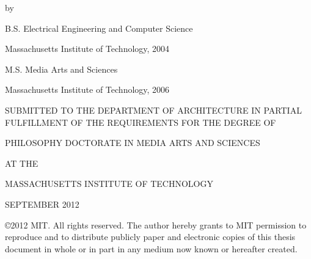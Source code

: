 \thispagestyle{empty}
\begin{addmargin}[-1cm]{-3cm}
\begin{center}
    \begingroup
        \color{Maroon}\spacedallcaps{\myTitle}
    \endgroup

    by

    \spacedlowsmallcaps{\myName}

    \vspace{2mm}
    
    B.S. Electrical Engineering and Computer Science
    
    Massachusetts Institute of Technology, 2004
    
    \vspace{2mm}

    M.S. Media Arts and Sciences
    
    Massachusetts Institute of Technology, 2006
    
    \vspace{2mm}

SUBMITTED TO THE DEPARTMENT OF ARCHITECTURE IN PARTIAL
FULFILLMENT OF THE REQUIREMENTS FOR THE DEGREE OF

    \vspace{2mm}

PHILOSOPHY DOCTORATE IN MEDIA ARTS AND SCIENCES

AT THE

MASSACHUSETTS INSTITUTE OF TECHNOLOGY

    \vspace{2mm}

SEPTEMBER 2012

    \vspace{2mm}

\copyright 2012 MIT.  All rights reserved.
The author hereby grants to MIT permission to reproduce
and to distribute publicly paper and electronic
copies of this thesis document in whole or in part
in any medium now known or hereafter created.

\end{center}        


\begin{flushright}
  \vspace{5mm}


\end{flushright}
\end{addmargin}

